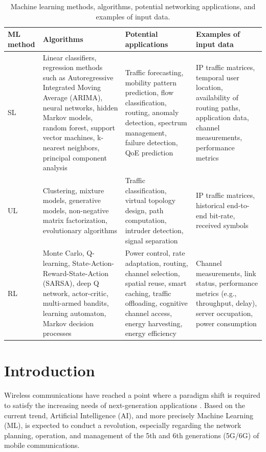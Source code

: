 \documentclass{article}
\begin{document}
\begin{table}[t!]
	\caption{Machine learning methods, algorithms, potential networking applications, and examples of input data.}
	\label{table:ml_taxonomy}
	\centering
	\scriptsize
	\begin{tabular}{|p{}|p{}|p{}|p{}|}
		\hline
		\textbf{ML method} & \textbf{Algorithms} & \textbf{Potential applications} & \textbf{Examples of input data} \\\hline
		SL & Linear classifiers, regression methods such as Autoregressive Integrated Moving Average (ARIMA), neural networks, hidden Markov models, random forest, support vector machines, k-nearest neighbors, principal component analysis &Traffic forecasting, mobility pattern prediction, flow classification, routing, anomaly detection, spectrum management, failure detection, QoE prediction & IP traffic matrices, temporal user location, availability of routing paths, application data, channel measurements, performance metrics \\\hline
		UL & Clustering, mixture models, generative models, non-negative matrix factorization, evolutionary algorithms & Traffic classification, virtual topology design, path computation, intruder detection, signal separation& IP traffic matrices, historical end-to-end bit-rate, received symbols \\\hline
		RL & Monte Carlo, Q-learning, State-Action-Reward-State-Action (SARSA), deep Q network, actor-critic, multi-armed bandits, learning automaton, Markov decision processes & Power control, rate adaptation, routing, channel selection, spatial reuse, smart caching, traffic offloading, cognitive channel access, energy harvesting, energy efficiency & Channel measurements, link status, performance metrics (e.g., throughput, delay), server occupation, power consumption \\\hline
	\end{tabular}
\end{table}

\section{Introduction}
Wireless communications have reached a point where a paradigm shift is required to satisfy the increasing needs of next-generation applications \cite{osseiran2014scenarios}. Based on the current trend, Artificial Intelligence (AI), and more precisely Machine Learning (ML), is expected to conduct a revolution, especially regarding the network planning, operation, and management of the 5th and 6th generations (5G/6G) of mobile communications. 
\end{document}

